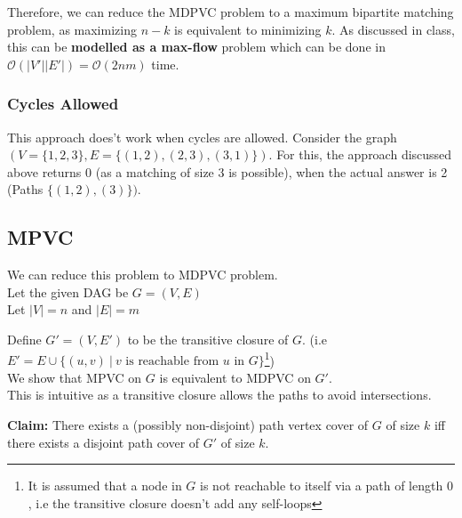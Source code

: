 \documentclass[11pt, fleqn]{article}
\begin{document}
Therefore, we can reduce the MDPVC problem to a maximum bipartite matching problem, as maximizing $n - k$ is equivalent to minimizing $k$. As discussed in class, this can be \textbf{modelled as a max-flow} problem which can be done in $\mathcal{O}\left(|V'||E'|\right) = \mathcal{O}(2nm)$ time.

\subsubsection*{Cycles Allowed}
This approach does't work when cycles are allowed. Consider the graph $(V = \{1, 2, 3\}, E = \{(1,2), (2,3), (3, 1)\})$. For this, the approach discussed above returns $0$ (as a matching of size 3 is possible), when the actual answer is 2 (Paths $\{(1, 2), (3)\})$.

\newpage
\subsection*{MPVC}
We can reduce this problem to MDPVC problem.\\
Let the given DAG be $G = (V, E)$\\
Let $|V| = n$ and $|E| = m$

\smallskip
Define $G' = (V, E')$ to be the transitive closure of $G$. (i.e $E' = E \cup \{(u, v) \ | \ \text{$v$ is reachable from $u$ in $G$}\}$\footnote{It is assumed that a node in $G$ is not reachable to itself via a path of length $0$, i.e the transitive closure doesn't add any self-loops})\\
We show that MPVC on $G$ is equivalent to MDPVC on $G'$.\\
This is intuitive as a transitive closure allows the paths to avoid intersections.

\smallskip
\textbf{Claim:} There exists a (possibly non-disjoint) path vertex cover of $G$ of size $k$ iff there exists a disjoint path cover of $G'$ of size $k$.
\end{document}
